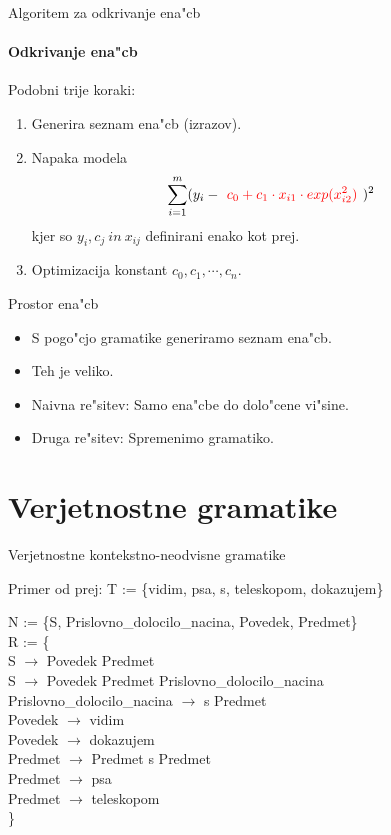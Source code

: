 \documentclass[t,usenames,dvipsnames]{beamer} %
\begin{document}
\begin{frame}{Algoritem za odkrivanje ena"cb}
\framesubtitle{Odkrivanje ena"cb}
Podobni trije koraki:
	\begin{enumerate}
	\item Generira seznam ena"cb (izrazov).
	\item Napaka modela \[ \sum_{i=1} ^m (y _i - \textcolor{red}{\textbf{
 \( c_0 + c_1 \cdot x_{i1} \cdot exp( x_{i2} ^2 ) \)
}})^2  \]
kjer so \( y_i, c_j\ in\ x_{ij} \)
definirani enako kot prej.
	\item Optimizacija konstant \( c_0, c_1, \cdots, c_n \).
	\end{enumerate}
\end{frame}

\begin{frame}{Prostor ena"cb}
    \begin{itemize}[<+->]
        \item S pogo"cjo gramatike generiramo seznam ena"cb.
        \item Teh je veliko.
        \item Naivna re"sitev: Samo ena"cbe do dolo"cene vi"sine.
        \item Druga re"sitev: Spremenimo gramatiko.
	\invisible<1-4>{\item \color{red}{Verjetnostne gramatike}}
    \end{itemize}
\end{frame}

\section{Verjetnostne gramatike}

\begin{frame}{Verjetnostne kontekstno-neodvisne gramatike}
	\pause
	\begin{block}{Primer od prej:} 
    T := \{vidim, psa, s, teleskopom, dokazujem\}

    N := \{S, Prislovno\_dolocilo\_nacina,  Povedek,
    Predmet\} \\
    R := \{ \\
	S $\to$ Povedek Predmet  \\
    S $\to$ Povedek Predmet Prislovno\_dolocilo\_nacina \\
    Prislovno\_dolocilo\_nacina $\to$ s Predmet \\
    Povedek $\to$ vidim \\
    Povedek $\to$ dokazujem \\
    Predmet $\to$ Predmet s Predmet \\
    Predmet $\to$ psa \\
    Predmet $\to$ teleskopom \\
    \}
	\end{block}
\end{frame}
\end{document}
